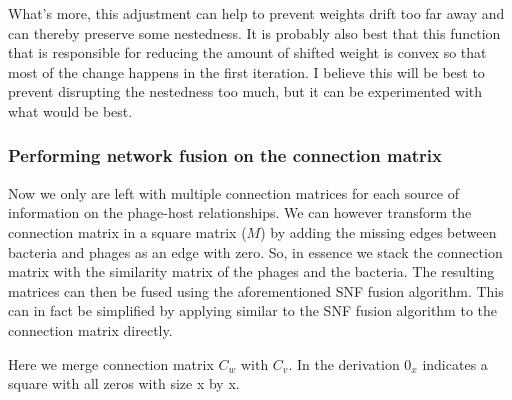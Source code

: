 \documentclass{article}
\begin{document}
What's more, this adjustment can help to prevent weights drift too far away and
can thereby preserve some nestedness. It is probably also best
that this function that is responsible for reducing the amount of shifted weight
is convex so that most of the change happens in the 
first iteration. I believe this will be best to prevent disrupting the 
nestedness too much, but it can be experimented with what would be best.

\subsubsection{Performing network fusion on the connection matrix}

Now we only are left with multiple connection matrices for each source of 
information on the phage-host relationships. We can however transform the
connection matrix in a square matrix ($M$) by adding the missing edges between
bacteria and phages as an edge with zero. So, in essence we stack
the connection matrix with the similarity matrix of the phages and the bacteria.
The resulting matrices can then
be fused using the aforementioned SNF fusion algorithm. This can in fact
be simplified by applying similar to the SNF fusion algorithm to the connection matrix 
directly. 

Here we merge connection matrix $C_w$ with $C_v$. In the derivation $0_x$ indicates a square with all zeros with size x by x.
\end{document}
